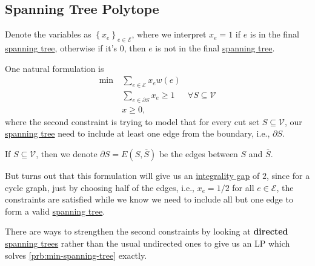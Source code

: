 \subsection{Spanning Tree Polytope}
Denote the variables as \(\left\{ x_e \right\} _{e\in \mathcal{E} }\), where we interpret \(x_e = 1\) if \(e\) is in the final \hyperref[def:spanning-tree]{spanning tree}, otherwise if it's \(0\), then \(e\) is not in the final \hyperref[def:spanning-tree]{spanning tree}.

One natural formulation is
\[
	\begin{aligned}
		\min~ & \sum_{e\in \mathcal{E} } x_e w(e)                                  \\
		      & \sum_{e\in \partial S} x_e \geq 1 & \forall S\subseteq \mathcal{V} \\
		      & x \geq 0,
	\end{aligned}
\]
where the second constraint is trying to model that for every cut set \(S \subseteq \mathcal{V} \), our \hyperref[def:spanning-tree]{spanning tree} need to include at least one edge from the boundary, i.e., \(\partial S\).

\begin{notation}
	If \(S \subseteq \mathcal{V} \), then we denote \(\partial S = E(S, \overline{S} )\) be the edges between \(S\) and \(\overline{S} \).
\end{notation}

But turns out that this formulation will give us an \hyperref[def:integrality-gap]{integrality gap} of \(2\), since for a cycle graph, just by choosing half of the edges, i.e., \(x_e = 1 / 2\) for all \(e\in \mathcal{E} \), the constraints are satisfied while we know we need to include all but one edge to form a valid \hyperref[def:spanning-tree]{spanning tree}.

\begin{remark}
	There are ways to strengthen the second constraints by looking at \textbf{directed} \hyperref[def:spanning-tree]{spanning trees} rather than the usual undirected ones to give us an LP which solves \autoref{prb:min-spanning-tree} exactly.
\end{remark}

